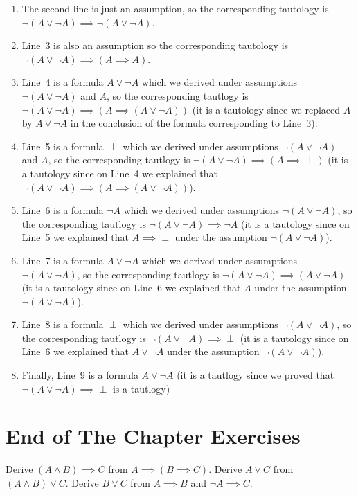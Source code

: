 \begin{enumerate}
  \item The second line is just an assumption, so the corresponding tautology is
    $\lnot (A \lor \lnot A) \implies \lnot (A \lor \lnot A)$.
  \item Line~3 is also an assumption so the corresponding tautology is
    $\lnot (A \lor \lnot A) \implies (A \implies A)$.
  \item Line~4 is a formula $A \lor \lnot A$ which we derived under assumptions
    $\lnot (A \lor \lnot A)$ and $A$, so the corresponding tautlogy is
    $\lnot (A \lor \lnot A) \implies (A \implies (A \lor \lnot A))$ (it is a
    tautology since we replaced $A$ by $A \lor \lnot A$ in the conclusion of
    the formula corresponding to Line~3).
  \item Line~5 is a formula $\perp$ which we derived under assumptions
    $\lnot (A \lor \lnot A)$ and $A$, so the corresponding tautlogy is
    $\lnot (A \lor \lnot A) \implies (A \implies \perp)$ (it is a
    tautology since on Line~4 we explained that $\lnot (A \lor \lnot A)
    \implies (A \implies (A \lor \lnot A))$).
  \item Line~6 is a formula $\lnot A$ which we derived under assumptions
    $\lnot (A \lor \lnot A)$, so the corresponding tautlogy is
    $\lnot (A \lor \lnot A) \implies \lnot A$ (it is a
    tautology since on Line~5 we explained that $A \implies \perp$ under the
    assumption $\lnot (A \lor \lnot A)$).
  \item Line~7 is a formula $A \lor \lnot A$ which we derived under assumptions
    $\lnot (A \lor \lnot A)$, so the corresponding tautlogy is
    $\lnot (A \lor \lnot A) \implies (A \lor \lnot A)$ (it is a
    tautology since on Line~6 we explained that $A$ under the
    assumption $\lnot (A \lor \lnot A)$).
  \item Line~8 is a formula $\perp$ which we derived under assumptions
    $\lnot (A \lor \lnot A)$, so the corresponding tautlogy is
    $\lnot (A \lor \lnot A) \implies \perp$ (it is a
    tautology since on Line~6 we explained that $A \lor \lnot A$ under the
    assumption $\lnot (A \lor \lnot A)$).
  \item Finally, Line~9 is a formula $A \lor \lnot A$ (it is a tautlogy since
    we proved that $\lnot (A \lor \lnot A) \implies \perp$ is a tautlogy)
\end{enumerate}


\section*{End of The Chapter Exercises}
\begin{exercises}
  \exercise Derive $(A \land B) \implies C$ from
    $A \implies (B \implies C)$.
  \exercise Derive $A \lor C$ from
    $(A \land B) \lor C$.
  \exercise Derive $B \lor C$ from
    $A \implies B$ and $\lnot A \implies C$.
\end{exercises}

